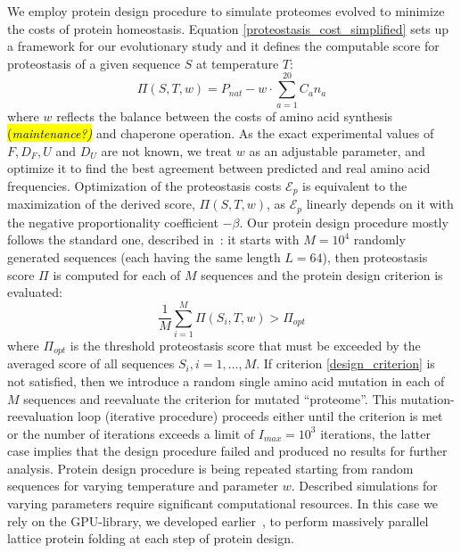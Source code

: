\documentclass[10pt,letterpaper]{article}
\begin{document}
We employ protein design procedure to simulate proteomes evolved to minimize the costs of protein homeostasis. Equation \eqref{proteostasis_cost_simplified} sets up a framework for our evolutionary study and it defines the computable score for proteostasis of a given sequence $S$ at temperature $T$:
\begin{equation}
	\label{score_proteostasis}
	\Pi(S,T,\mathit{w}) = P_{nat} - \mathit{w}\cdot\sum\limits_{a=1}^{20}C_{a}n_{a}
\end{equation}
where $\mathit{w}$ reflects the balance between the costs of amino acid synthesis \hl{(\it maintenance?)} and chaperone operation. As the exact experimental values of $F,D_{F},U$ and $D_{U}$ are not known, we treat $\mathit{w}$ as an adjustable parameter, and optimize it to find the best agreement between predicted and real amino acid frequencies. Optimization of the proteostasis costs $\mathcal{E}_{p}$ is equivalent to the maximization of the derived score, $\Pi(S,T,\mathit{w})$, as $\mathcal{E}_{p}$ linearly depends on it with the negative proportionality coefficient $-\beta$. Our protein design procedure mostly follows the standard one, described in~\cite{Berezovsky2007Positive}: it starts with $M=10^{4}$ randomly generated sequences (each having the same length $L=64$), then proteostasis score $\Pi$ is computed for each of $M$ sequences and the protein design criterion is evaluated:
\begin{equation}
	\label{design_criterion}
	\frac{1}{M}\sum\limits_{i=1}^{M}\Pi(S_{i},T,\mathit{w}) > \Pi_{opt}
\end{equation}
where $\Pi_{opt}$ is the threshold proteostasis score that must be exceeded by the averaged score of all sequences $S_{i},i=1,\dots,M$. If criterion \eqref{design_criterion} is not satisfied, then we introduce a random single amino acid mutation in each of $M$ sequences and reevaluate the criterion for mutated ``proteome''. This mutation-reevaluation loop (iterative procedure) proceeds either until the criterion is met or the number of iterations exceeds a limit of $I_{max}=10^{3}$ iterations, the latter case implies that the design procedure failed and produced no results for further analysis. Protein design procedure is being repeated starting from random sequences for varying temperature and parameter $\mathit{w}$. Described simulations for varying parameters require significant computational resources. In this case we rely on the GPU-library, we developed earlier~\cite{Venev2015Massively}, to perform massively parallel lattice protein folding at each step of protein design.
\end{document}
